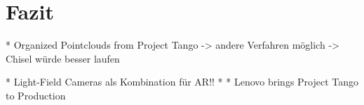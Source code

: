 \chapter{Fazit}

* Organized Pointclouds from Project Tango
	-> andere Verfahren möglich
	-> Chisel würde besser laufen

* Light-Field Cameras als Kombination für AR!!
* 
* Lenovo brings Project Tango to Production